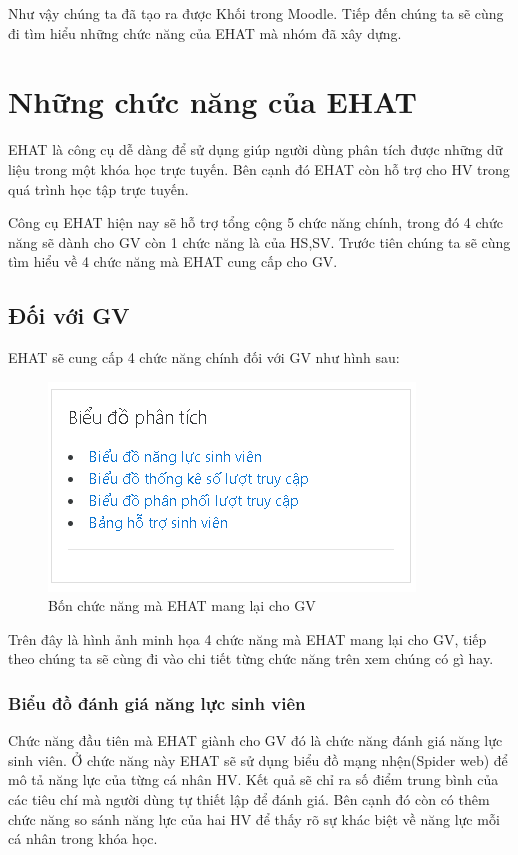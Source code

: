 Như vậy chúng ta đã tạo ra được Khối trong Moodle. Tiếp đến chúng ta sẽ cùng đi tìm hiểu những chức năng của EHAT mà nhóm đã xây dựng.

\newpage
\section{Những chức năng của EHAT}

EHAT là công cụ dễ dàng để sử dụng giúp người dùng phân tích được những dữ liệu trong một khóa học trực tuyến. Bên cạnh đó EHAT còn hỗ trợ cho HV trong quá trình học tập trực tuyến.

Công cụ EHAT hiện nay sẽ hỗ trợ tổng cộng 5 chức năng chính, trong đó 4 chức năng sẽ dành cho GV còn 1 chức năng là của HS,SV. Trước tiên chúng ta sẽ cùng tìm hiểu về 4 chức năng mà EHAT cung cấp cho GV.

\subsection{Đối với GV}

EHAT sẽ cung cấp 4 chức năng chính đối với GV như hình sau:

\begin{center}
	\begin{figure}[htp]
		\begin{center}
			\includegraphics[scale=1]{img/gvtool}
		\end{center}
		\caption{Bốn chức năng mà EHAT mang lại cho GV}
		\label{refhinh27}
	\end{figure}
\end{center}

Trên đây là hình ảnh minh họa 4 chức năng mà EHAT mang lại cho GV, tiếp theo chúng ta sẽ cùng đi vào chi tiết từng chức năng trên xem chúng có gì hay.

\subsubsection{Biểu đồ đánh giá năng lực sinh viên}
Chức năng đầu tiên mà EHAT giành cho GV đó là chức năng đánh giá năng lực sinh viên. Ở chức năng này EHAT sẽ sử dụng biểu đồ mạng nhện(Spider web) để mô tả năng lực của từng cá nhân HV. Kết quả sẽ chỉ ra số điểm trung bình của các tiêu chí mà người dùng tự thiết lập để đánh giá. Bên cạnh đó còn có thêm chức năng so sánh năng lực của hai HV để thấy rõ sự khác biệt về năng lực mỗi cá nhân trong khóa học.

